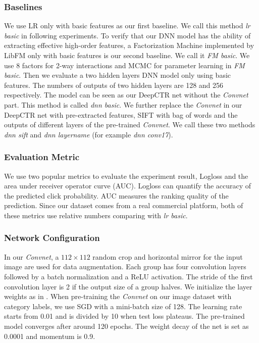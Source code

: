 \documentclass{sig-alternate}
\begin{document}
\subsubsection{Baselines}
We use LR only with basic features as our first baseline. We call this method \emph{lr basic} in following experiments. To verify that our DNN model has the ability of extracting effective high-order features,  a Factorization Machine implemented by LibFM \cite{rendle2012factorization}  only with basic features is our second baseline.  We call it \emph{FM basic}. We use 8 factors for 2-way interactions and MCMC for parameter learning in \emph{FM basic}. Then we  evaluate a two hidden layers DNN model only using basic features. The numbers of outputs of two hidden layers  are 128 and 256 respectively. The model can be seen as our DeepCTR net without the \emph{Convnet} part. This method is called \emph{dnn basic}. We further replace the \emph{Convnet} in our DeepCTR net with pre-extracted features, SIFT \cite{lowe1999object} with bag of words and the outputs of different layers of the pre-trained  \emph{Convnet}. We call these two methods \emph{dnn sift} and \emph{dnn layername} (for example \emph{dnn conv17}). 
\subsubsection{Evaluation Metric}
We use two popular metrics to evaluate the experiment result, Logloss and the area under receiver operator curve (AUC).  Logloss can quantify the accuracy of the predicted click probability. AUC measures the ranking quality of the prediction. Since our dataset comes from a real commercial platform,  both of these metrics use relative numbers comparing with \emph{lr basic}.
\subsubsection{Network Configuration}
In our \emph{Convnet},  a $112 \times 112$ random crop  and horizontal mirror for the input image are used for data augmentation. Each group has four convolution layers followed by a batch normalization \cite{ioffe2015batch} and a ReLU \cite{nair2010rectified} activation. The stride of the first convolution layer is 2 if the output size of a group halves.  We initialize the layer weights as in  \cite{he2015delving}. When pre-training the \emph{Convnet} on our image dataset with category labels,  we use SGD with a mini-batch size of 128. The learning rate starts from 0.01 and is divided by 10 when test loss plateaus. The pre-trained model converges after around 120 epochs. The weight decay of the net is set as 0.0001 and momentum is 0.9. 
\end{document}
